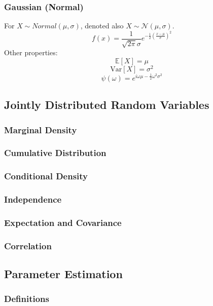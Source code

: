 \documentclass[twoside,twocolumn]{article}
\begin{document}
\subsubsection{Gaussian (Normal)}
For $X\sim Normal(\mu, \sigma)$, denoted also $X \sim \mathcal{N}(\mu, \sigma)$.
\begin{equation}
  \displaystyle f(x)=\frac{1}{\sqrt{2\pi}\sigma}e^{-\frac{1}{2}\left(\frac{x-\mu}{\sigma}\right)^2}
\end{equation}
Other properties:
\begin{equation}
  \mathbb { E }[X] = \mu
\end{equation}
\begin{equation}
  \mbox{Var}[X] = \sigma^2
\end{equation}
\begin{equation}
  \psi(\omega) = e^{i\omega\mu-\frac{1}{2}\omega^2\sigma^2}
\end{equation}
\subsection{Jointly Distributed Random Variables}
\subsubsection{Marginal Density}
\subsubsection{Cumulative Distribution}
\subsubsection{Conditional Density}
\subsubsection{Independence}
\subsubsection{Expectation and Covariance}
\subsubsection{Correlation}
\subsection{Parameter Estimation}
\subsubsection{Definitions}
\end{document}
